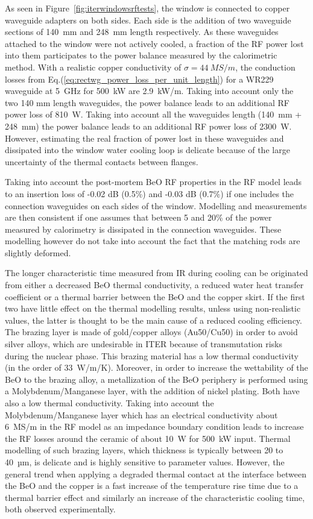 As seen in Figure~\ref{fig:iterwindowsrftests}, the window is connected to copper waveguide adapters on both sides. Each side is the addition of two waveguide sections of 140~mm and 248~mm length respectively. As these waveguides attached to the window were not actively cooled, a fraction of the RF power lost into them participates to the power balance measured by the calorimetric method. With a realistic copper conductivity of $\sigma=44~\si{MS/m}$, the conduction losses  from Eq.(\ref{eq:rectwg_power_loss_per_unit_length}) for a WR229 waveguide at 5~GHz for 500~kW are 2.9~kW/m. Taking into account only the two 140 mm length waveguides, the power balance leads to an additional RF power loss of 810~W. Taking into account all the waveguides length (140~mm + 248~mm) the power balance leads to an additional RF power loss of 2300~W. However, estimating the real fraction of power lost in these waveguides and dissipated into the window water cooling loop is delicate because of the large uncertainty of the thermal contacts between flanges. 

Taking into account the post-mortem BeO RF properties in the RF model leads to an insertion loss of -0.02 dB (0.5\%) and -0.03 dB (0.7\%) if one includes the connection waveguides on each sides of the window. Modelling and measurements are then consistent if one assumes that between 5 and 20\% of the power measured by calorimetry is dissipated in the connection waveguides. These modelling however do not take into account the fact that the matching rods are slightly deformed.

The longer characteristic time measured from IR during cooling can be originated from either a decreased BeO thermal conductivity, a reduced water heat transfer coefficient or a thermal barrier between the BeO and the copper skirt. If the first two have little effect on the thermal modelling results, unless using non-realistic values, the latter is thought to be the main cause of a reduced cooling efficiency. The brazing layer is made of gold/copper alloys (Au50/Cu50) in order to avoid silver alloys, which are undesirable in ITER because of transmutation risks during the nuclear phase. This brazing material has a low thermal conductivity (in the order of 33~\si{W/m/K}). Moreover, in order to increase the wettability of the BeO to the brazing alloy, a metallization of the BeO periphery is performed using a Molybdenum/Manganese layer, with the addition of nickel plating. Both have also a low thermal conductivity. Taking into account the Molybdenum/Manganese layer which has an electrical conductivity about 6~MS/m in the RF model as an impedance boundary condition leads to increase the RF losses around the ceramic of about 10~W for 500~kW input. Thermal modelling of such brazing layers, which thickness is typically between 20 to 40~µm, is delicate and is highly sensitive to parameter values. However, the general trend when applying a degraded thermal contact at the interface between the BeO and the copper is a fast increase of the temperature rise time due to a thermal barrier effect and similarly an increase of the characteristic cooling time, both observed experimentally. 


